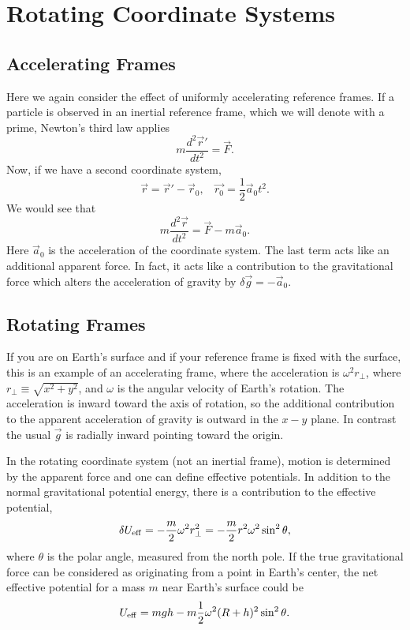 %

\section{Rotating Coordinate Systems}
\bigskip

\subsection{Accelerating Frames}

Here we again consider the effect of uniformly accelerating reference frames. If a particle is observed in an inertial reference frame, which we will denote with a prime, Newton's third law applies
\begin{equation}
m\frac{d^2\vec{r}'}{dt^2}=\vec{F}.
\end{equation}
Now, if we have a second coordinate system,
\begin{equation}
\vec{r}=\vec{r}'-\vec{r}_0,~~~~\vec{r_0}=\frac{1}{2}\vec{a}_0t^2.
\end{equation}
We would see that
\begin{equation}
m\frac{d^2\vec{r}}{dt^2}=\vec{F}-m\vec{a}_0.
\end{equation}
Here $\vec{a}_0$ is the acceleration of the coordinate system. The last term acts like an additional apparent force. In fact, it acts like a contribution to the gravitational force which alters the acceleration of gravity by $\delta\vec{g}=-\vec{a}_0$.

\subsection{Rotating Frames}
If you are on Earth's surface and if your reference frame is fixed with the surface, this is an example of an accelerating frame, where the acceleration is $\omega^2 r_{\perp}$, where $r_{\perp}\equiv\sqrt{x^2+y^2}$, and $\omega$ is the angular velocity of Earth's rotation. The acceleration is inward toward the axis of rotation, so the additional contribution to the apparent acceleration of gravity is outward in the $x-y$ plane. In contrast the usual $\vec{g}$ is radially inward pointing toward the origin. 

In the rotating coordinate system (not an inertial frame), motion is determined by the apparent force and one can define effective potentials. In addition to the normal gravitational potential energy, there is a contribution to the effective potential,
\begin{equation}
\delta U_{\rm eff}=-\frac{m}{2}\omega^2r_\perp^2=-\frac{m}{2}r^2\omega^2\sin^2\theta,
\end{equation}
where $\theta$ is the polar angle, measured from the north pole. If the true gravitational force can be considered as originating from a point in Earth's center, the net effective potential for a mass $m$ near Earth's surface could be 
\begin{equation}
U_{\rm eff}=mgh-m\frac{1}{2}\omega^2(R+h)^2\sin^2\theta.
\end{equation}

